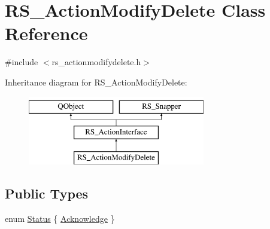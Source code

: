 \hypertarget{classRS__ActionModifyDelete}{\section{R\-S\-\_\-\-Action\-Modify\-Delete Class Reference}
\label{classRS__ActionModifyDelete}
}


{\ttfamily \#include $<$rs\-\_\-actionmodifydelete.\-h$>$}

Inheritance diagram for R\-S\-\_\-\-Action\-Modify\-Delete\-:\begin{figure}[H]
\begin{center}
\leavevmode
\includegraphics[height=3.000000cm]{classRS__ActionModifyDelete}
\end{center}
\end{figure}
\subsection*{Public Types}
\begin{DoxyCompactItemize}
\item 
enum \hyperlink{classRS__ActionModifyDelete_a70e3636d2aa7028a5e5741f7becd1df1}{Status} \{ \hyperlink{classRS__ActionModifyDelete_a70e3636d2aa7028a5e5741f7becd1df1ade02076a7773bc443da8fcdb6ec0c7cf}{Acknowledge}
 \}
\end{DoxyCompactItemize}
